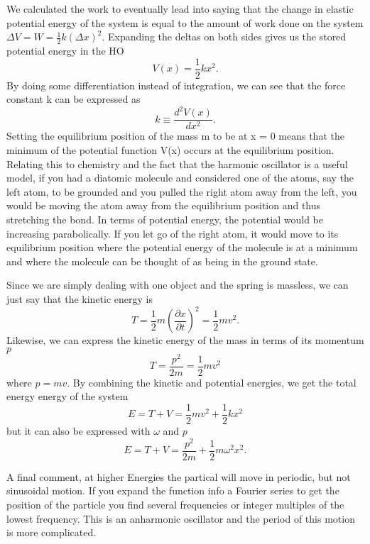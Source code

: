 \documentclass{article}
\newcommand{\be}{\begin{equation}}
\newcommand{\ee}{\end{equation}}
\begin{document}
We calculated the work to eventually lead into saying that the change in elastic potential energy of the system is equal to the amount of work done on the system $\Delta V = W = \frac{1}{2}k (\Delta x)^2$. Expanding the deltas on both sides gives us the stored potential energy in the HO
\be
V(x) = \frac{1}{2}k x^2.
\ee
By doing some differentiation instead of integration, we can see that the force constant k can be expressed as
\be
k \equiv \frac{d^2 V(x)}{d x^2}.
\ee
Setting the equilibrium position of the mass m to be at x = 0 means that the minimum of the potential function V(x) occurs at the equilibrium position. Relating this to chemistry
and the fact that the harmonic oscillator is a useful model, if you had a diatomic molecule and considered one of the atoms, say the left atom, to be grounded and you pulled the
right atom away from the left, you would be moving the atom away from the equilibrium position and thus stretching the bond. In terms of potential energy, the potential would be
increasing parabolically. If you let go of the right atom, it would move to its equilibrium position where the potential energy of the molecule is at a minimum and where the
molecule can be thought of as being in the ground state.

Since we are simply dealing with one object and the spring is massless, we can just say that the kinetic energy is
\be
T = \frac{1}{2}m (\frac{\partial x}{\partial t})^2 = \frac{1}{2}m v^2.
\ee
Likewise, we can express the kinetic energy of the mass in terms of its momentum $p$
\be
T = \frac{p^2}{2 m} = \frac{1}{2} m v^2
\ee
where $p = mv$. By combining the kinetic and potential energies, we get the total energy energy of the system
\be
E = T + V = \frac{1}{2}mv^2 + \frac{1}{2}kx^2
\ee
but it can also be expressed with $\omega$ and $p$
\be
E = T + V = \frac{p^2}{2 m} + \frac{1}{2}m  \omega^2 x^2 .
\ee







A final comment, at higher Energies the partical will move in periodic, but not sinusoidal motion.
If you expand the function info a Fourier series to get the position of the particle you find several frequencies or integer multiples of the lowest frequency.
This is an anharmonic oscillator and the period of this motion is more complicated. 
\end{document}
